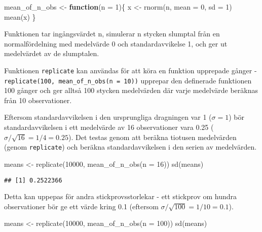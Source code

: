 \documentclass[
]{book}
\newenvironment{Shaded}{\begin{snugshade}}{\end{snugshade}}
\newcommand{\AttributeTok}[1]{\textcolor[rgb]{0.77,0.63,0.00}{#1}}
\newcommand{\ControlFlowTok}[1]{\textcolor[rgb]{0.13,0.29,0.53}{\textbf{#1}}}
\newcommand{\DecValTok}[1]{\textcolor[rgb]{0.00,0.00,0.81}{#1}}
\newcommand{\FunctionTok}[1]{\textcolor[rgb]{0.00,0.00,0.00}{#1}}
\newcommand{\NormalTok}[1]{#1}
\newcommand{\OtherTok}[1]{\textcolor[rgb]{0.56,0.35,0.01}{#1}}
\theoremstyle{definition}
\theoremstyle{definition}
\theoremstyle{definition}
\theoremstyle{definition}
\theoremstyle{remark}
\begin{document}
\begin{Shaded}
\begin{Highlighting}[]
\NormalTok{mean\_of\_n\_obs }\OtherTok{\textless{}{-}} \ControlFlowTok{function}\NormalTok{(}\AttributeTok{n =} \DecValTok{1}\NormalTok{)\{}
\NormalTok{  x }\OtherTok{\textless{}{-}} \FunctionTok{rnorm}\NormalTok{(n, }\AttributeTok{mean =} \DecValTok{0}\NormalTok{, }\AttributeTok{sd =} \DecValTok{1}\NormalTok{)}
  \FunctionTok{mean}\NormalTok{(x)}
\NormalTok{\}}
\end{Highlighting}
\end{Shaded}

Funktionen tar ingångsvärdet n, simulerar n stycken slumptal från en normalfördelning med medelvärde 0 och standardavvikelse 1, och ger ut medelvärdet av de slumptalen.

Funktionen \texttt{replicate} kan användas för att köra en funktion upprepade gånger - \texttt{replicate(100,\ mean\_of\_n\_obs(n\ =\ 10))} upprepar den definerade funktionen 100 gånger och ger alltså 100 stycken medelvärden där varje medelvärde beräknas från 10 observationer.

Eftersom standardavvikelsen i den ursprungliga dragningen var 1 (\(\sigma = 1\)) bör standardavvikelsen i ett medelvärde av 16 observationer vara 0.25 (\(\sigma / \sqrt{16} = 1 / 4 = 0.25\)). Det testas genom att beräkna tiotusen medelvärden (genom \texttt{replicate}) och beräkna standardavvikelsen i den serien av medelvärden.

\begin{Shaded}
\begin{Highlighting}[]
\NormalTok{means }\OtherTok{\textless{}{-}} \FunctionTok{replicate}\NormalTok{(}\DecValTok{10000}\NormalTok{, }\FunctionTok{mean\_of\_n\_obs}\NormalTok{(}\AttributeTok{n =} \DecValTok{16}\NormalTok{))}
\FunctionTok{sd}\NormalTok{(means)}
\end{Highlighting}
\end{Shaded}

\begin{verbatim}
## [1] 0.2522366
\end{verbatim}

Detta kan uppepas för andra stickprovsstorlekar - ett stickprov om hundra observationer bör ge ett värde kring 0.1 (eftersom \(\sigma / \sqrt{100} = 1 / 10 = 0.1\)).

\begin{Shaded}
\begin{Highlighting}[]
\NormalTok{means }\OtherTok{\textless{}{-}} \FunctionTok{replicate}\NormalTok{(}\DecValTok{10000}\NormalTok{, }\FunctionTok{mean\_of\_n\_obs}\NormalTok{(}\AttributeTok{n =} \DecValTok{100}\NormalTok{))}
\FunctionTok{sd}\NormalTok{(means)}
\end{Highlighting}
\end{Shaded}
\end{document}
